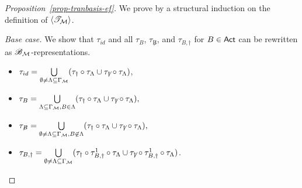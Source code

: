 \begin{proof}[Proposition~\ref{prop-tranbasis-ef}]
	We prove by a structural induction on the definition of $\langle {\mathscr{T} }_{\mathcal{M} } \rangle$.
	
	
	\smallskip
	\noindent \emph{Base case.} We show that $\tau_{id}$ and all $\tau_{B}$, $\tau_{\not B}$, and $\tau_{B, \dag}$ for $B \in {\sf Act}$ can be rewritten as ${\mathscr{B} }_{\mathcal{M} }$-representations.
	\begin{itemize}
	\item $\tau_{id} = \bigcup\limits_{\emptyset \neq \Lambda  \subseteq\Gamma_{{\mathcal{M} }}} (\tau_\dag \circ \tau_{\Lambda} \cup \tau_{{\not \dag}} \circ \tau_{\Lambda})$, 
	\item $ \tau_{B} = \bigcup\limits_{ \Lambda \subseteq\Gamma_{{\mathcal{M} }}, B \in \Lambda} (\tau_\dag \circ \tau_{\Lambda} \cup \tau_{{\not \dag}} \circ \tau_{\Lambda}),$
	\item	$ \tau_{\not B} =
	\bigcup\limits_{\emptyset \neq \Lambda \subseteq\Gamma_{{\mathcal{M} }}, B \not \in \Lambda} (\tau_\dag \circ \tau_{\Lambda} \cup \tau_{\not \dag} \circ \tau_{\Lambda}),$  
	\item $\tau_{B,\dag} = \bigcup\limits_{\emptyset \neq \Lambda \subseteq \Gamma_{{\mathcal{M} }}}(\tau_{\dag} \circ \tau_{B,\dag}^1\circ\tau_{\Lambda} \cup \tau_{\not \dag} \circ \tau_{B,\dag}^1\circ\tau_{\Lambda} )$.
	\end{itemize}
	

\end{proof}
